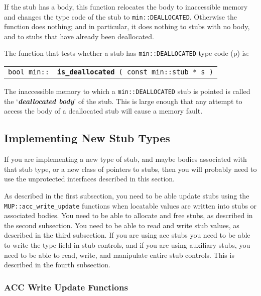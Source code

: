 \documentclass[12pt]{article}
\makeatletter
\newcommand{\key}[1]{{\bf \em #1}\index{#1}}
\newcommand{\ttindex}[1]{\index{#1@{\tt #1}}}
\newcommand{\minindex}[1]{\ttindex{min::#1}\ttindex{#1}}
\newcommand{\pagref}[1]{p\pageref{#1}}
\newcommand{\EOL}{\penalty \exhyphenpenalty}
\newenvironment{indpar}[1][0.3in]%
	{\begin{list}{}%
		     {\setlength{\itemsep}{0in}%
		      \setlength{\topsep}{0in}%
		      \setlength{\parsep}{1ex}%
		      \setlength{\labelwidth}{#1}%
		      \setlength{\leftmargin}{#1}%
		      \addtolength{\leftmargin}{\labelsep}}%
	 \item}%
	{\end{list}}
\newcommand{\LABEL}[1]{\label{#1}}
\newcommand{\MINKEY}[1]{{\tt \bf #1}\minindex{#1}}
\makeatother
\begin{document}
If the stub has a body, this function relocates the body to inaccessible
memory and changes the type code of the stub to
{\tt min::DEALLOCATED}.  Otherwise the function does nothing; and
in particular, it does nothing to stubs with no body, and to stubs
that have already been deallocated.

The function that tests whether a stub
has {\tt min::DEALLOCATED} type code (\pagref{MIN::DEALLOCATED}) is:

\begin{indpar}\begin{tabular}{r@{}l}
\verb|bool min::| & \MINKEY{is\_deallocated}\verb| ( const min::stub * s )|
\LABEL{MIN::IS_DEALLOCATED}
\end{tabular}\end{indpar}

The inaccessible memory to which a {\tt min::DEALLOCATED} stub is
pointed is called the `\key{deallocated body}' of the stub.
This is large enough that any attempt to access the body of a
deallocated stub will cause a memory fault.

\subsection{Implementing New Stub Types}
\label{IMPLEMENTING-NEW-STUB-TYPES}

If you are implementing a new type of stub, and maybe bodies
associated with that stub type, or a new class of pointers to stubs,
then you will probably need to use the unprotected
interfaces described in this section.

As described in the first subsection, you need to be able update stubs
using the {\tt MUP::\EOL acc\_\EOL write\_\EOL update} functions
when locatable values are written into stubs or associated bodies.
You need to be able to allocate and free stubs, as described in the
second subsection.  You need to be able to read and write stub values,
as described in the third subsection.  If you are using acc stubs you
need to be able to write the type field in stub controls, and if
you are using auxiliary stubs, you need to be able to read, write,
and manipulate entire stub controls.
This is described in the fourth subsection.

\subsubsection{ACC Write Update Functions}
\label{ACC-WRITE-UPDATE-FUNCTIONS}
\end{document}
